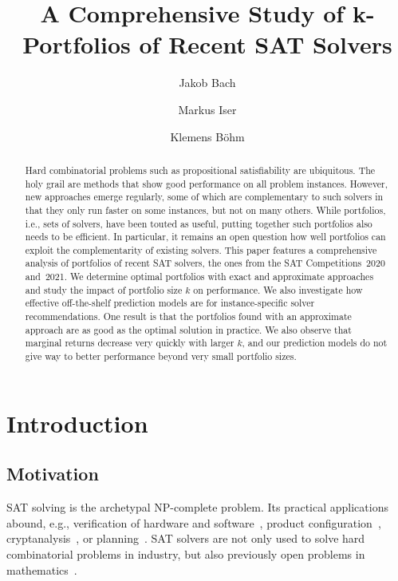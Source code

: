 \documentclass[a4paper,USenglish,pdfa]{lipics-v2021} %
\title{A Comprehensive Study of k-Portfolios of Recent SAT Solvers}
\author{Jakob Bach}{Karlsruhe Institute of Technology, Germany}{jakob.bach@kit.edu}{https://orcid.org/0000-0003-0301-2798}{}
\author{Markus Iser}{Karlsruhe Institute of Technology, Germany}{markus.iser@kit.edu}{https://orcid.org/0000-0003-2904-232X}{}
\author{Klemens Böhm}{Karlsruhe Institute of Technology, Germany}{klemens.boehm@kit.edu}{}{}
\begin{document}
\maketitle

\begin{abstract}
Hard combinatorial problems such as propositional satisfiability are ubiquitous. 
The holy grail are methods that show good performance on all problem instances. 
However, new approaches emerge regularly, some of which are complementary to such solvers in that they only run faster on some instances, but not on many others. 
While portfolios, i.e., sets of solvers, have been touted as useful, putting together such portfolios also needs to be efficient. 
In particular, it remains an open question how well portfolios can exploit the complementarity of existing solvers. 
This paper features a comprehensive analysis of portfolios of recent SAT solvers, the ones from the SAT Competitions~2020 and~2021. 
We determine optimal portfolios with exact and approximate approaches and study the impact of portfolio size $k$ on performance. 
We also investigate how effective off-the-shelf prediction models are for instance-specific solver recommendations.
One result is that the portfolios found with an approximate approach are as good as the optimal solution in practice. 
We also observe that marginal returns decrease very quickly with larger $k$, and our prediction models do not give way to better performance beyond very small portfolio sizes. 
\end{abstract}

\section{Introduction}
\label{sec:introduction}

\subsection{Motivation}

SAT solving is the archetypal NP-complete problem.
Its practical applications abound, e.g., verification of hardware and software~\cite{Kaufmann:2021:Amulet,Buning:2020:QPRVerify}, product configuration~\cite{Janota:2014:Configuration}, cryptanalysis~\cite{Nejati:2020:CDCLCrypto}, or planning~\cite{Schreiber:2021:Lilotane}.
SAT solvers are not only used to solve hard combinatorial problems in industry, but also previously open problems in mathematics~\cite{Heule:2016:Pyth,Heule:2018:Schur}. 
\end{document}

